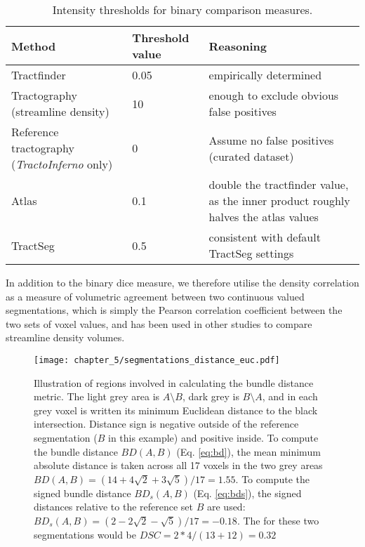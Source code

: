 \documentclass[12pt,phd,a4paper,twoside]{ucl_thesis}
\begin{document}
\begin{table}[h!]
  \caption{Intensity thresholds for binary comparison measures.}
  \label{tab:thresh}
  \small
  \begin{tabularx}{\textwidth}{>{\raggedright\arraybackslash}X l >{\raggedright\arraybackslash}X}
    \toprule
    Method    & Threshold value & Reasoning \\
    \midrule
    Tractfinder   & 0.05 & empirically determined \\
    Tractography (streamline density) & 10 & enough to exclude obvious false positives \\
    Reference tractography (\textit{TractoInferno} only) & 0 & Assume no false positives (curated dataset) \\
    Atlas         & 0.1 & double the tractfinder value, as the inner product roughly halves the atlas values \\
    TractSeg      & 0.5 & consistent with default TractSeg settings \\ \bottomrule
  \end{tabularx}
\end{table}

In addition to the binary \gls{dice} measure, we therefore utilise the density correlation as a measure of volumetric agreement between two continuous valued segmentations, which is simply the Pearson correlation coefficient between the two sets of voxel values, and has been used in other studies to compare streamline density volumes\autocite{Radwan2022, Schilling2021a}.

\begin{SCfigure}[50][htbp!]
  \centering
  \texttt{[image: chapter\_5/segmentations\_distance\_euc.pdf]}
  \caption[Bundle distance calculation]{Illustration of regions involved in calculating the bundle distance metric. The light grey area is $A\setminus B$, dark grey is $B\setminus A$, and in each grey voxel is written its minimum Euclidean distance to the black intersection. Distance sign is negative outside of the reference segmentation ($B$ in this example) and positive inside. To compute the bundle distance $BD(A,B)$ (Eq. \ref{eq:bd}), the mean minimum absolute distance is taken across all 17 voxels in the two grey areas $BD(A,B) = (14+4\sqrt{2}+3\sqrt{5})/17 = 1.55$. To compute the signed bundle distance $BD_s(A,B)$ (Eq. \ref{eq:bds}), the signed distances relative to the reference set $B$ are used: $BD_s(A,B) = (2-2\sqrt{2}-\sqrt{5})/17 = -0.18$.
  The  for these two segmentations would be $DSC = 2*4/(13+12) = 0.32$}
  \label{fig:BD}
\end{SCfigure}
\end{document}
